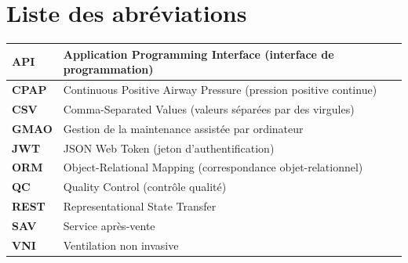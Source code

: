 \chapter*{Liste des abréviations}

{\renewcommand{\arraystretch}{1.3}\small
\begin{tabular}{|p{3cm}|p{11.60cm}|}
\hline
\textbf{API} & Application Programming Interface (interface de programmation) \\ \hline
\textbf{CPAP} & Continuous Positive Airway Pressure (pression positive continue) \\ \hline
\textbf{CSV} & Comma-Separated Values (valeurs séparées par des virgules) \\ \hline
\textbf{GMAO} & Gestion de la maintenance assistée par ordinateur \\ \hline
\textbf{JWT} & JSON Web Token (jeton d'authentification) \\ \hline
\textbf{ORM} & Object-Relational Mapping (correspondance objet-relationnel) \\ \hline
\textbf{QC} & Quality Control (contrôle qualité) \\ \hline
\textbf{REST} & Representational State Transfer \\ \hline
\textbf{SAV} & Service après-vente \\ \hline
\textbf{VNI} & Ventilation non invasive \\ \hline
\end{tabular}
}

